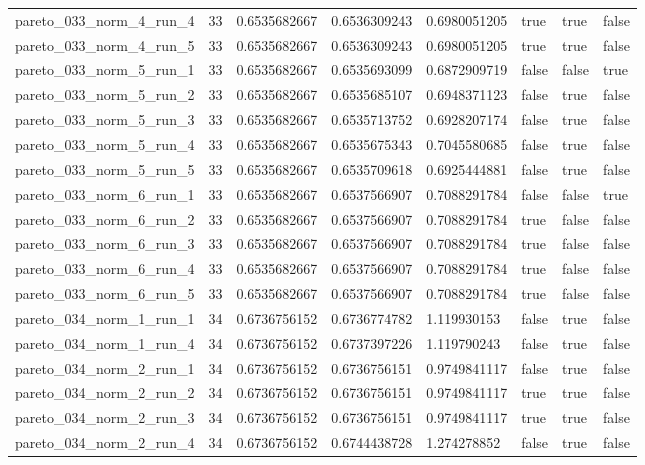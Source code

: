 \begin{tabular}{@{}llllllll@{}}
pareto\_033\_norm\_4\_run\_4 & 33 & 0.6535682667 & 0.6536309243 & 0.6980051205 & true & true & false \\
pareto\_033\_norm\_4\_run\_5 & 33 & 0.6535682667 & 0.6536309243 & 0.6980051205 & true & true & false \\
pareto\_033\_norm\_5\_run\_1 & 33 & 0.6535682667 & 0.6535693099 & 0.6872909719 & false & false & true \\
pareto\_033\_norm\_5\_run\_2 & 33 & 0.6535682667 & 0.6535685107 & 0.6948371123 & false & true & false \\
pareto\_033\_norm\_5\_run\_3 & 33 & 0.6535682667 & 0.6535713752 & 0.6928207174 & false & true & false \\
pareto\_033\_norm\_5\_run\_4 & 33 & 0.6535682667 & 0.6535675343 & 0.7045580685 & false & true & false \\
pareto\_033\_norm\_5\_run\_5 & 33 & 0.6535682667 & 0.6535709618 & 0.6925444881 & false & true & false \\
pareto\_033\_norm\_6\_run\_1 & 33 & 0.6535682667 & 0.6537566907 & 0.7088291784 & false & false & true \\
pareto\_033\_norm\_6\_run\_2 & 33 & 0.6535682667 & 0.6537566907 & 0.7088291784 & true & false & false \\
pareto\_033\_norm\_6\_run\_3 & 33 & 0.6535682667 & 0.6537566907 & 0.7088291784 & true & false & false \\
pareto\_033\_norm\_6\_run\_4 & 33 & 0.6535682667 & 0.6537566907 & 0.7088291784 & true & false & false \\
pareto\_033\_norm\_6\_run\_5 & 33 & 0.6535682667 & 0.6537566907 & 0.7088291784 & true & false & false \\
pareto\_034\_norm\_1\_run\_1 & 34 & 0.6736756152 & 0.6736774782 & 1.119930153 & false & true & false \\
pareto\_034\_norm\_1\_run\_4 & 34 & 0.6736756152 & 0.6737397226 & 1.119790243 & false & true & false \\
pareto\_034\_norm\_2\_run\_1 & 34 & 0.6736756152 & 0.6736756151 & 0.9749841117 & false & true & false \\
pareto\_034\_norm\_2\_run\_2 & 34 & 0.6736756152 & 0.6736756151 & 0.9749841117 & true & true & false \\
pareto\_034\_norm\_2\_run\_3 & 34 & 0.6736756152 & 0.6736756151 & 0.9749841117 & true & true & false \\
pareto\_034\_norm\_2\_run\_4 & 34 & 0.6736756152 & 0.6744438728 & 1.274278852 & false & true & false \\

\end{tabular}
